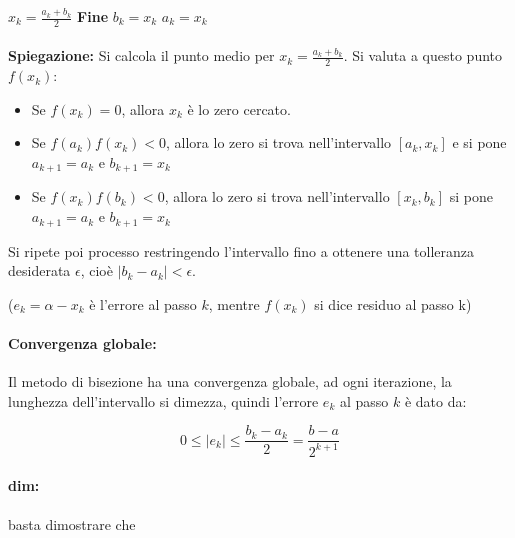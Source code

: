 \documentclass[a4paper, 11pt]{article}
\begin{document}
        
        \begin{algorithm}
            \begin{algorithmic}[1]
            \State $x_k = \frac{a_k + b_k}{2}$
                    \State \textbf{Fine}
                    \State $b_k = x_k$
                \Else
                    \State $a_k = x_k$
                \EndIf
            \EndFor
        \end{algorithmic}
        \end{algorithm}

        \paragraph{}
        \textbf{Spiegazione: }
        Si calcola il punto medio per \( x_k = \frac{a_k + b_k}{2} \).
        Si valuta a questo punto \( f(x_k) \):
        \begin{itemize}
            \item Se \( f(x_k) = 0 \), allora \( x_k \) è lo zero cercato.
            \item Se \( f(a_k)f(x_k) < 0 \), allora lo zero si trova nell'intervallo \([a_k, x_k]\) e si pone $a_{k+1} = a_k$ e $b_{k+1} = x_k$
            \item Se \( f(x_k)f(b_k) < 0 \), allora lo zero si trova nell'intervallo \([x_k, b_k]\) si pone $a_{k+1} = a_k$ e $b_{k+1} = x_k$
        \end{itemize}
        Si ripete poi processo restringendo l'intervallo fino a ottenere una tolleranza desiderata \( \epsilon \), cioè \( |b_k - a_k| < \epsilon \).
        
        ($e_k = \alpha - x_k$ è l'errore al passo $k$, mentre $f(x_k)$ si dice residuo al passo k)

        \paragraph{Convergenza globale:}
        Il metodo di bisezione ha una convergenza globale, ad ogni iterazione, la lunghezza dell'intervallo si dimezza, quindi l'errore \( e_k \) al passo \( k \) è dato da:
        
        \[
            0 \le |e_k| \le \frac{b_k - a_k}{2} = \frac{b-a}{2^{k+1}}
        \]
        \paragraph{dim: } basta dimostrare che 
\end{document}
